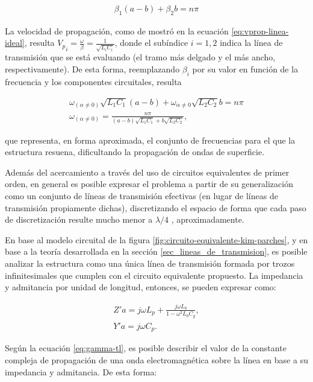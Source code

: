 \begin{align}
	\beta_1 (a-b) + \beta_2 b = n\pi
\end{align}

La velocidad de propagación, como de mostró en la ecuación \ref{eq:vprop-linea-ideal}, resulta ${V_p}_i = \frac{\omega}{\beta} = \frac{1}{\sqrt{L_i C_i}}$, donde el subíndice $i=1,2$ indica la línea de transmisión que se está evaluando (el tramo más delgado y el más ancho, respectivamente). De esta forma, reemplazando $\beta_i$ por su valor en función de la frecuencia y los componentes circuitales, resulta

\begin{align}
	\omega_{(\alpha\neq 0)} \sqrt{L_1 C_1} (a-b) + \omega_{\alpha\neq 0} \sqrt{L_2 C_2} b = n\pi \\
	\omega_{(\alpha\neq 0)} = \frac{n\pi}{(a-b) \sqrt{L_1 C_1} + b \sqrt{L_2 C_2}},
\end{align}

que representa, en forma aproximada, el conjunto de frecuencias para el que la estructura resuena, dificultando la propagación de ondas de superficie.


Además del acercamiento a través del uso de circuitos equivalentes de primer orden, en general es posible expresar el problema a partir de su generalización como un conjunto de líneas de transmisión efectivas (en lugar de líneas de transmisión propiamente dichas), discretizando el espacio de forma que cada paso de discretización resulte mucho menor a $\lambda/4$ \cite{Caloz:ElectromagneticMetamaterials}, aproximadamente.

En base al modelo circuital de la figura \ref{fig:circuito-equivalente-kim-parches}, y en base a la teoría desarrollada en la sección \ref{sec_lineas_de_transmision}, es posible analizar la estructura como una única línea de transmisión formada por trozos infinitesimales que cumplen con el circuito equivalente propuesto. La impedancia y admitancia por unidad de longitud, entonces, se pueden expresar como:

\begin{align}
	Z' a = j\omega L_p + \frac{j\omega L_b}{1-\omega^2 L_b C_g}, \\
	Y' a = j\omega C_p.
\end{align}

Según la ecuación \ref{eq:gamma-tl}, es posible describir el valor de la constante compleja de propagación de una onda electromagnética sobre la línea en base a su impedancia y admitancia. De esta forma:

